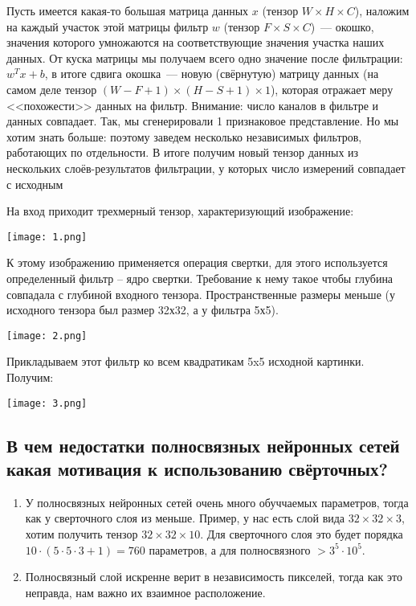 Пусть имеется какая-то большая матрица данных $x$ (тензор $W \times H \times C$), наложим на каждый участок этой матрицы фильтр $w$ (тензор $F \times S \times C$)~--- окошко, значения которого умножаются на соответствующие значения участка наших данных. От куска матрицы мы получаем всего одно значение после фильтрации: $w^Tx +b $, в итоге сдвига окошка~--- новую (свёрнутую) матрицу данных (на самом деле тензор $(W - F + 1) \times (H - S + 1) \times 1$), которая отражает меру <<похожести>> данных на фильтр. Внимание: число каналов в фильтре и данных совпадает. Так, мы сгенерировали 1 признаковое представление. Но мы хотим знать больше: поэтому заведем несколько независимых фильтров, работающих по отдельности. В итоге получим новый тензор данных из нескольких слоёв-результатов фильтрации, у которых число измерений совпадает с исходным

На вход приходит трехмерный тензор, характеризующий изображение:  

\begin{center}
    \texttt{[image: 1.png]}
\end{center}

К этому изображению применяется операция свертки, для этого используется определенный фильтр – ядро свертки. Требование к нему такое чтобы глубина совпадала с глубиной входного тензора. Пространственные размеры меньше (у исходного тензора был размер 32х32, а у фильтра 5х5).

\begin{center}
    \texttt{[image: 2.png]}
\end{center}

Прикладываем этот фильтр ко всем квадратикам 5x5 исходной картинки. Получим:

\begin{center}
    \texttt{[image: 3.png]}
\end{center}












\subsection{В чем недостатки полносвязных нейронных сетей какая мотивация к использованию
свёрточных?}

\begin{enumerate}
    \item У полносвязных нейронных сетей очень много обуччаемых параметров, тогда как у сверточного слоя из меньше. Пример, у нас есть слой вида $32 \times 32 \times 3$, хотим получить тензор $32 \times 32 \times 10$. Для сверточного слоя это будет порядка $10 \cdot (5 \cdot 5 \cdot 3 + 1) = 760$ параметров, а для полносвязного $> 3^5 \cdot 10^5$.
    \item Полносвязный слой искренне верит в независимость пикселей, тогда как это неправда, нам важно их взаимное расположение.
\end{enumerate}





